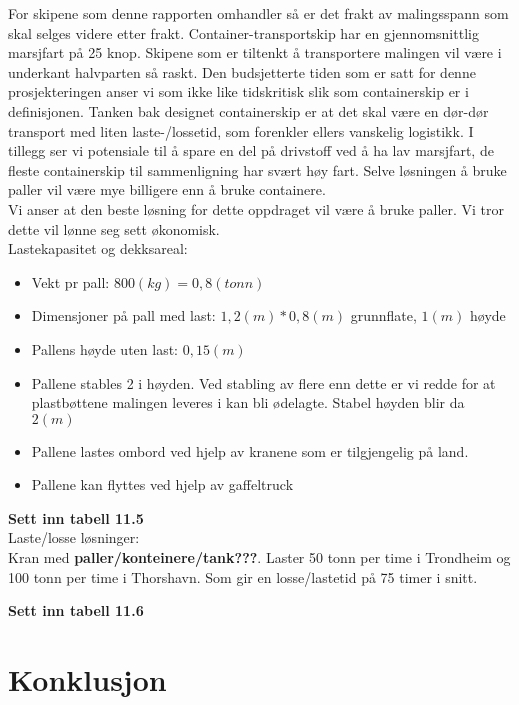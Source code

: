 \documentclass[norsk]{article}
\begin{document}
For skipene som denne rapporten omhandler så er det frakt av malingsspann som skal selges videre etter frakt. Container-transportskip har en gjennomsnittlig marsjfart på 25 knop. Skipene som er tiltenkt å transportere malingen vil være i underkant halvparten så raskt. Den budsjetterte tiden som er satt for denne prosjekteringen anser vi som ikke like tidskritisk slik som containerskip er i definisjonen. Tanken bak designet containerskip er at det skal være en dør-dør transport med liten laste-/lossetid, som forenkler ellers vanskelig logistikk. I tillegg ser vi potensiale til å spare en del på drivstoff ved å ha lav marsjfart, de fleste containerskip til sammenligning har svært høy fart. Selve løsningen å bruke paller vil være mye billigere enn å bruke containere. \\

Vi anser at den beste løsning for dette oppdraget vil være å bruke paller. Vi tror dette vil lønne seg sett økonomisk.  \\  

Lastekapasitet og dekksareal:
\begin{itemize}
\item Vekt pr pall: $800 (kg) = 0,8 (tonn)$
\item Dimensjoner på pall med last: $1,2 (m) * 0,8 (m)$ grunnflate, $1 (m)$ høyde
\item Pallens høyde uten last: $0,15 (m)$
\item Pallene stables 2 i høyden. Ved stabling av flere enn dette er vi redde for at plastbøttene malingen leveres i kan bli ødelagte. Stabel høyden blir da $2 (m)$
\item Pallene lastes ombord ved hjelp av kranene som er tilgjengelig på land.
\item Pallene kan flyttes ved hjelp av gaffeltruck
\end{itemize}

\textbf{Sett inn tabell 11.5} \\

Laste/losse løsninger:\\
Kran med \textbf{paller/konteinere/tank???}. Laster 50 tonn per time i Trondheim og 100 tonn per time i Thorshavn. Som gir en losse/lastetid på 75 timer i snitt.

 \textbf{Sett inn tabell 11.6}\\
 
\section{Konklusjon}
\end{document}
